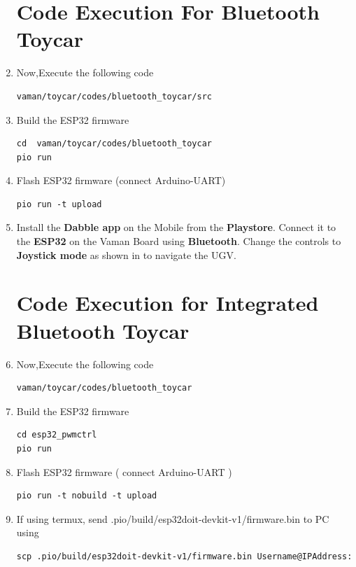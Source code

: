 \begin{enumerate}[label=\thesection.\arabic*.,ref=\thesection.\theenumi]
\section{Code Execution For Bluetooth Toycar}
\raggedright

\item Now,Execute the following code
\begin{lstlisting}
vaman/toycar/codes/bluetooth_toycar/src
\end{lstlisting}

\item Build the ESP32 firmware
\begin{lstlisting}
cd  vaman/toycar/codes/bluetooth_toycar
pio run
\end{lstlisting} 

\item Flash ESP32 firmware (connect Arduino-UART)
\begin{lstlisting}
pio run -t upload
\end{lstlisting} 
\item Install the \textbf{Dabble app} on the Mobile from the \textbf{Playstore}. Connect it to the \textbf{ESP32} on the Vaman Board using \textbf{Bluetooth}. Change the controls to \textbf{Joystick mode} as shown in to navigate the UGV.\\

\section{Code Execution for Integrated Bluetooth Toycar}
\raggedright
\item Now,Execute the following code 

\begin{lstlisting}
vaman/toycar/codes/bluetooth_toycar
\end{lstlisting}

\item Build the ESP32 firmware
\begin{lstlisting}
cd esp32_pwmctrl
pio run
\end{lstlisting} 

\item Flash ESP32 firmware ( connect Arduino-UART  )
\begin{lstlisting}
pio run -t nobuild -t upload
\end{lstlisting} 

\item If using termux, send .pio/build/esp32doit-devkit-v1/firmware.bin to PC using
\begin{lstlisting}
scp .pio/build/esp32doit-devkit-v1/firmware.bin Username@IPAddress:
\end{lstlisting} 


\end{enumerate}
